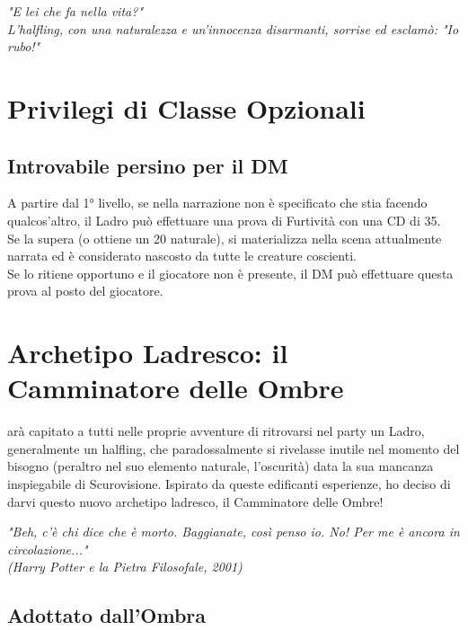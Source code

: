 
\begin{DndReadAloud}
  \it
  "E lei che fa nella vita?" \\ L'halfling, con una naturalezza e un'innocenza disarmanti, sorrise ed esclamò: "Io rubo!"
\end{DndReadAloud}

\section{Privilegi di Classe Opzionali}

\subsection{Introvabile persino per il DM}

A partire dal 1° livello, se nella narrazione non è specificato che stia facendo qualcos'altro, il Ladro può effettuare una prova di Furtività con una CD di 35. \\ Se la supera (o ottiene un 20 naturale), si materializza nella scena attualmente narrata ed è considerato nascosto da tutte le creature coscienti. \\ Se lo ritiene opportuno e il giocatore non è presente, il DM può effettuare questa prova al posto del giocatore.

\section{Archetipo Ladresco: il Camminatore delle Ombre}

arà capitato a tutti nelle proprie avventure di ritrovarsi nel party un Ladro, generalmente un halfling, che paradossalmente si rivelasse inutile nel momento del bisogno (peraltro nel suo elemento naturale, l'oscurità) data la sua mancanza inspiegabile di Scurovisione. Ispirato da queste edificanti esperienze, ho deciso di darvi questo nuovo archetipo ladresco, il Camminatore delle Ombre!

\begin{DndReadAloud}
  \it
  "Beh, c'è chi dice che è morto. Baggianate, così penso io. No! Per me è ancora in circolazione..." \\ (Harry Potter e la Pietra Filosofale, 2001)
\end{DndReadAloud}

\subsection{Adottato dall'Ombra}

